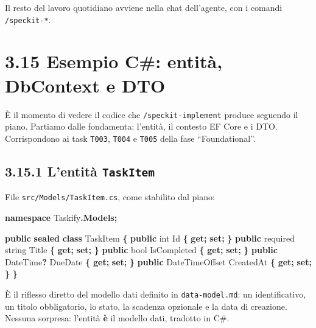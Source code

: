 \documentclass[
  italian,
  10pt,
]{book}
\newenvironment{Shaded}{\begin{snugshade}}{\end{snugshade}}
\newcommand{\DataTypeTok}[1]{\textcolor[rgb]{0.13,0.29,0.53}{#1}}
\newcommand{\FunctionTok}[1]{\textcolor[rgb]{0.13,0.29,0.53}{\textbf{#1}}}
\newcommand{\KeywordTok}[1]{\textcolor[rgb]{0.13,0.29,0.53}{\textbf{#1}}}
\newcommand{\NormalTok}[1]{#1}
\newcommand{\OperatorTok}[1]{\textcolor[rgb]{0.81,0.36,0.00}{\textbf{#1}}}
\begin{document}
Il resto del lavoro quotidiano avviene nella chat dell'agente, con i
comandi \texttt{/speckit-*}.

\section{3.15 Esempio C\#: entità, DbContext e
DTO}\label{esempio-c-entituxe0-dbcontext-e-dto}

È il momento di vedere il codice che \texttt{/speckit-implement} produce
seguendo il piano. Partiamo dalle fondamenta: l'entità, il contesto EF
Core e i DTO. Corrispondono ai task \texttt{T003}, \texttt{T004} e
\texttt{T005} della fase ``Foundational''.

\subsection{\texorpdfstring{3.15.1 L'entità
\texttt{TaskItem}}{3.15.1 L'entità TaskItem}}\label{lentituxe0-taskitem}

File \texttt{src/Models/TaskItem.cs}, come stabilito dal piano:

\begin{Shaded}
\begin{Highlighting}[]
\KeywordTok{namespace}\NormalTok{ Taskify}\OperatorTok{.}\FunctionTok{Models}\OperatorTok{;}

\KeywordTok{public} \KeywordTok{sealed} \KeywordTok{class}\NormalTok{ TaskItem}
\OperatorTok{\{}
    \KeywordTok{public} \DataTypeTok{int}\NormalTok{ Id }\OperatorTok{\{} \KeywordTok{get}\OperatorTok{;} \KeywordTok{set}\OperatorTok{;} \OperatorTok{\}}
    \KeywordTok{public}\NormalTok{ required }\DataTypeTok{string}\NormalTok{ Title }\OperatorTok{\{} \KeywordTok{get}\OperatorTok{;} \KeywordTok{set}\OperatorTok{;} \OperatorTok{\}}
    \KeywordTok{public} \DataTypeTok{bool}\NormalTok{ IsCompleted }\OperatorTok{\{} \KeywordTok{get}\OperatorTok{;} \KeywordTok{set}\OperatorTok{;} \OperatorTok{\}}
    \KeywordTok{public}\NormalTok{ DateTime}\OperatorTok{?}\NormalTok{ DueDate }\OperatorTok{\{} \KeywordTok{get}\OperatorTok{;} \KeywordTok{set}\OperatorTok{;} \OperatorTok{\}}
    \KeywordTok{public}\NormalTok{ DateTimeOffset CreatedAt }\OperatorTok{\{} \KeywordTok{get}\OperatorTok{;} \KeywordTok{set}\OperatorTok{;} \OperatorTok{\}}
\OperatorTok{\}}
\end{Highlighting}
\end{Shaded}

È il riflesso diretto del modello dati definito in
\texttt{data-model.md}: un identificativo, un titolo obbligatorio, lo
stato, la scadenza opzionale e la data di creazione. Nessuna sorpresa:
l'entità \textbf{è} il modello dati, tradotto in C\#.
\end{document}
